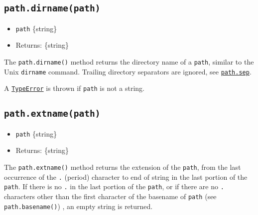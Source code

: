 \subsection{\texorpdfstring{\texttt{path.dirname(path)}}{path.dirname(path)}}\label{path.dirnamepath}

\begin{itemize}
\tightlist
\item
  \texttt{path} \{string\}
\item
  Returns: \{string\}
\end{itemize}

The \texttt{path.dirname()} method returns the directory name of a
\texttt{path}, similar to the Unix \texttt{dirname} command. Trailing
directory separators are ignored, see
\hyperref[pathsep]{\texttt{path.sep}}.

\begin{Shaded}
\begin{Highlighting}[]
\NormalTok{(}\NormalTok{)}\OperatorTok{;}
\end{Highlighting}
\end{Shaded}

A \href{errors.md\#class-typeerror}{\texttt{TypeError}} is thrown if
\texttt{path} is not a string.

\subsection{\texorpdfstring{\texttt{path.extname(path)}}{path.extname(path)}}\label{path.extnamepath}

\begin{itemize}
\tightlist
\item
  \texttt{path} \{string\}
\item
  Returns: \{string\}
\end{itemize}

The \texttt{path.extname()} method returns the extension of the
\texttt{path}, from the last occurrence of the \texttt{.} (period)
character to end of string in the last portion of the \texttt{path}. If
there is no \texttt{.} in the last portion of the \texttt{path}, or if
there are no \texttt{.} characters other than the first character of the
basename of \texttt{path} (see \texttt{path.basename()}) , an empty
string is returned.

